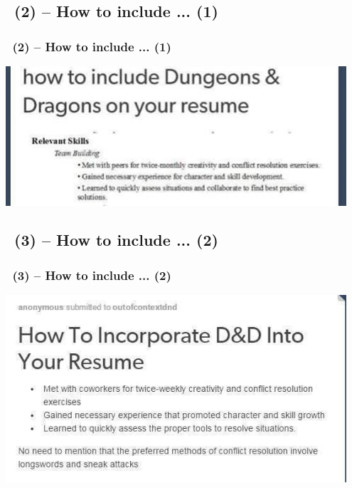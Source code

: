 \documentclass[slidetop,11pt]{beamer}
\begin{document}
\subsection{ \subsectionTtitle~(2)  -- How to include ... (1)}
\begin{frame}
	\frametitle{ \subsectionTtitle~(2) -- How to include ... (1)}
	\includegraphics[width=0.95\textwidth]{132926053-04fe2306-b5bd-4dc2-8403-439809517410.jpg} 
\end{frame} 

\subsection{ \subsectionTtitle~(3) -- How to include ... (2)}
\begin{frame}
	\frametitle{ \subsectionTtitle~(3) -- How to include ... (2)}
	\includegraphics[width=0.95\textwidth]{132926092-476f735d-d1cc-4ee4-9460-3e468ff5cd7a.jpeg} 
\end{frame}
\end{document}
